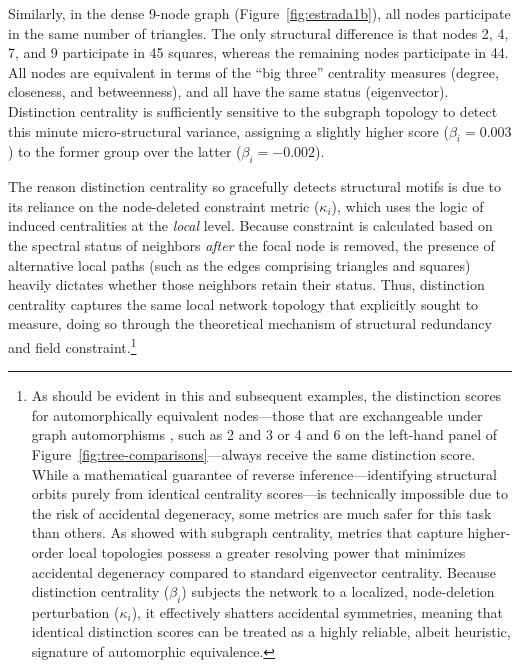 \documentclass[12pt]{article}
\begin{document}
Similarly, in the dense 9-node graph (Figure~\ref{fig:estrada1b}), all nodes participate in the same number of triangles. The only structural difference is that nodes 2, 4, 7, and 9 participate in 45 squares, whereas the remaining nodes participate in 44. All nodes are equivalent in terms of the \citet{freeman79} ``big three'' centrality measures (degree, closeness, and betweenness), and all have the same status (eigenvector). Distinction centrality is sufficiently sensitive to the subgraph topology to detect this minute micro-structural variance, assigning a slightly higher score ($\beta_i = 0.003$) to the former group over the latter ($\beta_i = -0.002$).

The reason distinction centrality so gracefully detects structural motifs is due to its reliance on the node-deleted constraint metric ($\kappa_i$), which uses the logic of induced centralities \citep{everett2010induced-817} at the \textit{local} level. Because constraint is calculated based on the spectral status of neighbors \emph{after} the focal node is removed, the presence of alternative local paths (such as the edges comprising triangles and squares) heavily dictates whether those neighbors retain their status. Thus, distinction centrality captures the same local network topology that \citet{estrada2005subgraph} explicitly sought to measure, doing so through the theoretical mechanism of structural redundancy and field constraint.\footnote{As should be evident in this and subsequent examples, the distinction scores for automorphically equivalent nodes---those that are exchangeable under graph automorphisms \citep{everett1985role-f64}, such as 2 and 3 or 4 and 6 on the left-hand panel of Figure~\ref{fig:tree-comparisons}---always receive the same distinction score. While a mathematical guarantee of reverse inference---identifying structural orbits purely from identical centrality scores---is technically impossible due to the risk of accidental degeneracy, some metrics are much safer for this task than others. As \citet{estrada2005subgraph} showed with subgraph centrality, metrics that capture higher-order local topologies possess a greater resolving power that minimizes accidental degeneracy compared to standard eigenvector centrality. Because distinction centrality ($\beta_i$) subjects the network to a localized, node-deletion perturbation ($\kappa_i$), it effectively shatters accidental symmetries, meaning that identical distinction scores can be treated as a highly reliable, albeit heuristic, signature of automorphic equivalence.}
\end{document}
